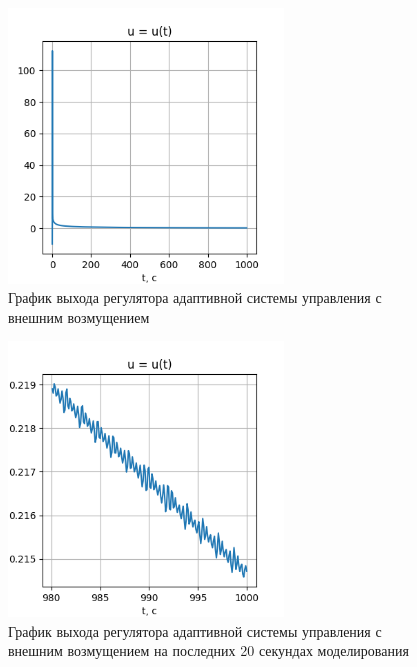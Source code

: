 \documentclass{article}
\begin{document}
\begin{figure}[h!]
  \centering
  \includegraphics[width=0.65\textwidth]{figs/1_u.png}
  \caption{График выхода регулятора адаптивной системы управления с внешним возмущением} 
  \label{fig:task1_y}
\end{figure}

\begin{figure}[h!]
  \centering
  \includegraphics[width=0.65\textwidth]{figs/1_u_small.png}
  \caption{График выхода регулятора адаптивной системы управления с внешним возмущением на последних 20 секундах моделирования} 
  \label{fig:task1_y}
\end{figure}
\end{document}
